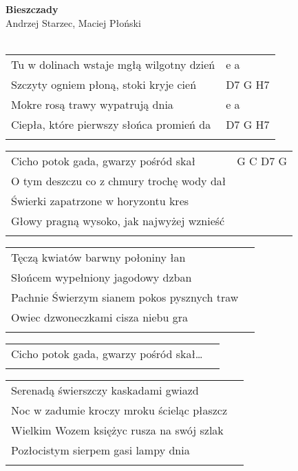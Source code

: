 \documentclass[a5paper]{article}
\begin{document}


\noindent
\fontsize{12pt}{15pt}\selectfont
\textbf{Bieszczady} \\
\fontsize{8pt}{10pt}\selectfont
Andrzej Starzec, Maciej Płoński \\ \\
\fontsize{10pt}{12pt}\selectfont
{}
\begin{tabular}{@{}p{8.5cm}p{3cm}@{}}
\noindent
Tu w dolinach wstaje mgłą wilgotny dzień & e a \\
Szczyty ogniem płoną, stoki kryje cień & D7 G H7 \\
Mokre rosą trawy wypatrują dnia & e a \\
Ciepła, które pierwszy słońca promień da & D7 G H7 \\ \\
\end{tabular}

\noindent
\begin{tabular}{@{}p{7.5cm}p{3cm}@{}}
Cicho potok gada, gwarzy pośród skał & G C D7 G \\
O tym deszczu co z chmury trochę wody dał \\
Świerki zapatrzone w horyzontu kres \\
Głowy pragną wysoko, jak najwyżej wznieść \\ \\
\end{tabular}

\noindent
\begin{tabular}{@{}p{9.5cm}p{3cm}@{}}
Tęczą kwiatów barwny połoniny łan \\
Słońcem wypełniony jagodowy dzban \\
Pachnie Świerzym sianem pokos pysznych traw \\
Owiec dzwoneczkami cisza niebu gra \\ \\
\end{tabular}

\noindent
\begin{tabular}{@{}p{8.5cm}p{3cm}@{}}
Cicho potok gada, gwarzy pośród skał… \\ \\
\end{tabular}

\noindent
\begin{tabular}{@{}p{9.5cm}p{3cm}@{}} 
Serenadą świerszczy kaskadami gwiazd \\
Noc w zadumie kroczy mroku ścieląc płaszcz \\
Wielkim Wozem księżyc rusza na swój szlak \\
Pozłocistym sierpem gasi lampy dnia \\ \\
\end{tabular}
\end{document}
